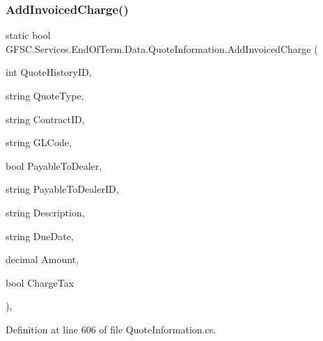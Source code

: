 \subsubsection{\texorpdfstring{Add\+Invoiced\+Charge()}{AddInvoicedCharge()}}
{\footnotesize\ttfamily static bool G\+F\+S\+C.\+Services.\+End\+Of\+Term.\+Data.\+Quote\+Information.\+Add\+Invoiced\+Charge (\begin{DoxyParamCaption}\item[{int}]{Quote\+History\+ID,  }\item[{string}]{Quote\+Type,  }\item[{string}]{Contract\+ID,  }\item[{string}]{G\+L\+Code,  }\item[{bool}]{Payable\+To\+Dealer,  }\item[{string}]{Payable\+To\+Dealer\+ID,  }\item[{string}]{Description,  }\item[{string}]{Due\+Date,  }\item[{decimal}]{Amount,  }\item[{bool}]{Charge\+Tax }\end{DoxyParamCaption})\hspace{0.3cm}{\ttfamily [static]}, {\ttfamily [package]}}



Definition at line 606 of file Quote\+Information.\+cs.

\mbox{\label{class_g_f_s_c_1_1_services_1_1_end_of_term_1_1_data_1_1_quote_information_a9c790d1d15350cb153195562c0ee980a}} 
